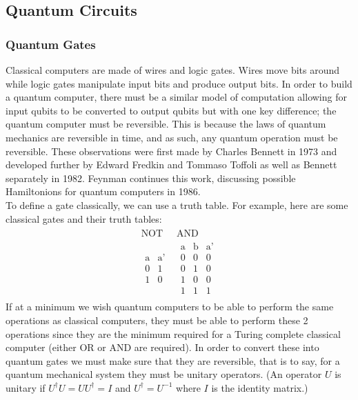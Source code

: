\documentclass[reqno]{amsart}
\numberwithin{equation}{section}
\numberwithin{figure}{section}
\begin{document}
\subsection{Quantum Circuits}
\subsubsection{Quantum Gates}
\begin{justify}
    Classical computers are made of wires and logic gates. Wires move bits around while logic gates manipulate input bits and produce output bits. In order to build a quantum computer, there must be a similar model of computation allowing for input qubits to be converted to output qubits but with one key difference; the quantum computer must be reversible. This is because the laws of quantum mechanics are reversible in time, and as such, any quantum operation must be reversible. These observations were first made by Charles Bennett in 1973 \cite{Bennett1973} and developed further by Edward Fredkin and Tommaso Toffoli as well as Bennett separately in 1982. \cite{FredkinToffoli1982, Bennett1982} Feynman continues this work, discussing possible Hamiltonions for quantum computers in 1986. \cite{Feynman1986} \\

To define a gate classically, we can use a truth table. For example, here are some classical gates and their truth tables:
    \begin{eqnarray}
        \begin{array}{c|c}
            \text{NOT} & \text{AND}\\
            \hline
            \begin{array}{c|c}
                \text{a} & \text{a'} \\
                \hline
                0 & 1 \\
                1 & 0
            \end{array} &
            \begin{array}{cc|c}
                \text{a} & \text{b} & \text{a'} \\
                \hline
                0 & 0 & 0 \\
                0 & 1 & 0 \\
                1 & 0 & 0 \\
                1 & 1 & 1
            \end{array}
        \end{array}
    \end{eqnarray}
    If at a minimum we wish quantum computers to be able to perform the same operations as classical computers, they must be able to perform these 2 operations since they are the minimum required for a Turing complete classical computer (either OR or AND are required). \cite{CopiCohenMcMahon2011} In order to convert these into quantum gates we must make sure that they are reversible, that is to say, for a quantum mechanical system they must be unitary operators. (An operator $U$ is unitary if $U^{\dagger}U = UU^{\dagger} = I$ and $U^{\dagger} = U^{-1}$ where $I$ is the identity matrix.) \\


\end{justify}
\end{document}
